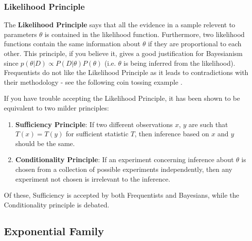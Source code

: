 \documentclass[]{article}
\theoremstyle{mattstyle}
\theoremstyle{definition}
\begin{document}
\subsubsection{Likelihood Principle}

The \textbf{Likelihood Principle} says that all the evidence in a sample relevent to parameters \(\theta\) is contained in the likelihood function. Furthermore, two likelihood functions contain the same information about \(\theta\) if they
are proportional to each other\cite{slides}. This principle, if you believe it, gives a good justification for Bayesianism since \(p(\theta|D) \propto P(D|\theta)P(\theta)\) (i.e. $\theta$ is being inferred from the likelihood). Frequentists do not like the Likelihood Principle as it leads to contradictions with their methodology - see the following coin tossing example \cite{MJordanNotes}.

If you have trouble accepting the Likelihood Principle, it has been shown to be equivalent to two milder principles:
\begin{enumerate}
	\item \textbf{Sufficiency Principle}: If two different observations $x$, $y$ are such that $T(x) = T(y)$ for sufficient statistic $T$, then inference based on $x$ and $y$ should be the same.
	\item \textbf{Conditionality Principle}: If an experiment concerning inference about $\theta$ is chosen from a collection of
	possible experiments independently, then any experiment not chosen is irrelevant to the inference.
\end{enumerate}

Of these, Sufficiency is accepted by both Frequentists and Bayesians, while the Conditionality principle is debated.

\newpage

\subsection{Exponential Family}\label{sec:expfam}
\end{document}
